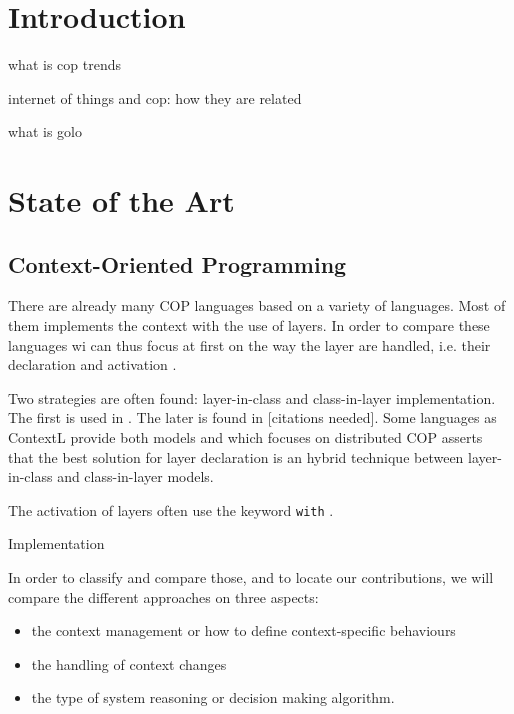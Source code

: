 \documentclass[a4paper]{article}
\begin{document}
\section{Introduction}
what is cop
trends

internet of things and cop: how they are related

what is golo \cite{ponge_golo_2013}

\section{State of the Art}

\subsection{Context-Oriented Programming}


There are already many COP languages based on a variety of languages. Most of them implements the context with the use of layers. In order to compare these languages wi can thus focus at first on the way the layer are handled, i.e. their declaration and activation \cite{appeltauer_comparison_2009}.

Two strategies are often found: layer-in-class and class-in-layer implementation. The first is used in \cite{appeltauer_declarative_2012} \cite{appeltauer_dedicated_2008} \cite{appeltauer_improving_2009} \cite{kamina_eventcj:_2011} \cite{nunez_declarative_2009}. The later is found in \cite{lincke_open_2011} [citations needed]. Some languages as ContextL provide both models and \cite{ghezzi_context_2010} which focuses on distributed COP asserts that the best solution for layer declaration is an hybrid technique between layer-in-class and class-in-layer models. 

The activation of layers often use the keyword \lstinline|with| \cite{haupt_contextj:_2011} \cite{appeltauer_declarative_2013} \cite{}.

Implementation

In order to classify and compare those, and to locate our contributions, we will compare the different approaches on three aspects:
\begin{itemize}
  \item the context management or how to define context-specific behaviours
  \item the handling of context changes
  \item the type of system reasoning or decision making algorithm.
\end{itemize}
\end{document}
